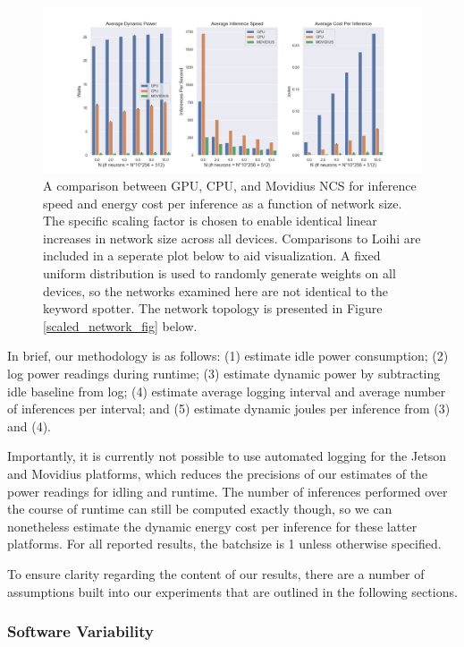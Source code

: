 \documentclass{article}
\begin{document}
\begin{figure}[ht!]
\centering
    \includegraphics[width=6.5in]{./figures/comp_summary.png}
	\caption{A comparison between GPU, CPU, and Movidius NCS for inference speed and energy cost per inference as a function of network size. The specific scaling factor is chosen to enable identical linear increases in network size across all devices. Comparisons to Loihi are included in a seperate plot below to aid visualization. A fixed uniform distribution is used to randomly generate weights on all devices, so the networks examined here are not identical to the keyword spotter. The network topology is presented in Figure \ref{scaled_network_fig} below.}
\label{comp_fig}
\end{figure}

In brief, our methodology is as follows: (1) estimate idle power consumption; (2) log power readings during runtime; (3) estimate dynamic power by subtracting idle baseline from log; (4) estimate average logging interval and average number of inferences per interval; and (5) estimate dynamic joules per inference from (3) and (4).

Importantly, it is currently not possible to use automated logging for the Jetson and Movidius platforms, which reduces the precisions of our estimates of the power readings for idling and runtime. The number of inferences performed over the course of runtime can still be computed exactly though, so we can nonetheless estimate the dynamic energy cost per inference for these latter platforms. For all reported results, the batchsize is 1 unless otherwise specified.

To ensure clarity regarding the content of our results, there are a number of assumptions built into our experiments that are outlined in the following sections.

\subsubsection{Software Variability}
\end{document}
